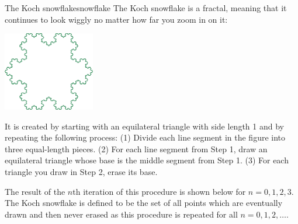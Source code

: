 \documentclass{watsonbook}
\begin{document}
  \begin{exercise}{The Koch snowflake}{snowflake}
    The Koch snowflake is a fractal, meaning that it continues to look
    wiggly no matter how far you zoom in on it:

    \begin{center} 
      \includegraphics[width=4cm]{figures/koch7.pdf}
    \end{center}
    
    It is created by starting with an equilateral triangle with
    side length 1 and by repeating the following process: (1) Divide
    each line segment in the figure into three equal-length
    pieces. (2) For each line segment from Step 1, draw an equilateral
    triangle whose base is the middle segment from Step 1. (3) For
    each triangle you draw in Step 2, erase its base.

    The result of the $n$th iteration of this procedure is shown below
    for $n=0,1,2,3$. The Koch snowflake is defined to be the set of
    all points which are eventually drawn and then never erased as
    this procedure is repeated for all $n=0,1,2,\ldots$.
    

\end{exercise}
\end{document}
